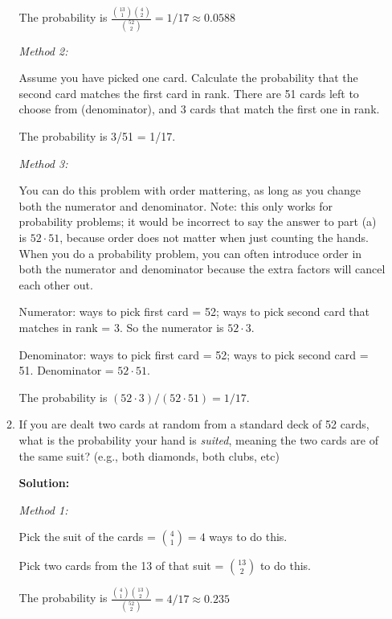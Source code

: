 \documentclass[11pt, letterpaper]{report}
\begin{document}
\begin{enumerate}
\begin{enumerate}
        The probability is $\displaystyle \frac{\displaystyle \binom{13}{1}\binom{4}{2}}{\displaystyle \binom{52}{2}} = 1/17
        \approx 0.0588$
        
        \emph{Method 2:}
        
        Assume you have picked one card.  Calculate the probability that the second card matches
        the first card in rank.  There are 51 cards left to choose from (denominator), and 
        3 cards that match the first one in rank.
        
        The probability is 3/51 = 1/17.
        
        \emph{Method 3:}
        
        You can do this problem with order mattering, as long as you change both the numerator
        and denominator.  Note: this only works for probability problems; it would be incorrect
        to say the answer to part (a) is $52\cdot 51$, because order does not matter when
        just counting the hands.  When you do a probability problem, you can often introduce
        order in both the numerator and denominator because the extra factors will cancel each
        other out.
        
        Numerator: ways to pick first card = 52; ways to pick second card that matches in rank
         = 3.  So the numerator is $52 \cdot 3$.
         
        Denominator: ways to pick first card = 52; ways to pick second card = 51.  Denominator
        = $52\cdot 51$.
        
        The probability is $(52\cdot 3)/(52 \cdot 51) = 1/17.$
        
        \item If you are dealt two cards at random from a standard deck of 52 cards, what is the probability your hand is \emph{suited}, meaning the two cards
        are of the same suit?  (e.g., both diamonds, both clubs, etc)
        
                \textbf{Solution:}
        
        \emph{Method 1:}
                
        Pick the suit of the cards = $\binom{4}{1} = 4$ ways to do this.
        
        Pick two cards from the 13 of that suit = $\binom{13}{2}$ to do this.
        
        The probability is $\displaystyle \frac{\displaystyle \binom{4}{1}\binom{13}{2}}{\displaystyle \binom{52}{2}} = 4/17
        \approx 0.235$
        

\end{enumerate}
\end{enumerate}
\end{document}
